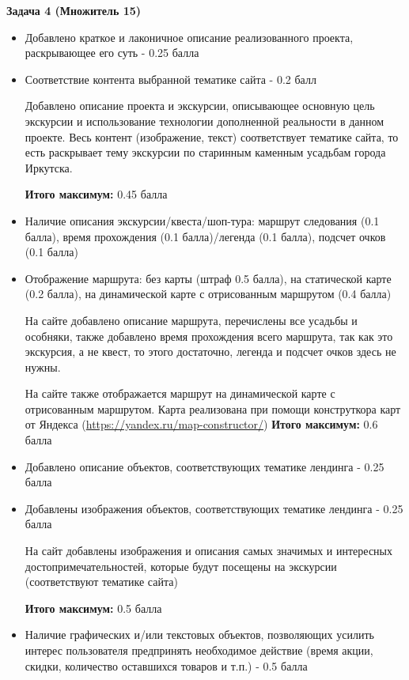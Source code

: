 \textbf{Задача 4 (Множитель 15)}
\begin{itemize}
    \item Добавлено краткое и лаконичное описание реализованного проекта, раскрывающее его суть - 0.25 балла
    \item Соответствие контента выбранной тематике сайта - 0.2 балл
    
    Добавлено описание проекта и экскурсии, описывающее основную цель экскурсии и использование технологии дополненной реальности в данном проекте. 
    Весь контент (изображение, текст) соответствует  тематике сайта, то есть раскрывает тему экскурсии по старинным каменным усадьбам города Иркутска.
    
    \textbf{Итого максимум:} 0.45 балла
    \item Наличие описания экскурсии/квеста/шоп-тура: маршрут следования (0.1 балла), время прохождения (0.1 балла)/легенда (0.1 балла), подсчет очков (0.1 балла)
    \item Отображение маршрута: без карты (штраф 0.5 балла), на статической карте (0.2 балла), на динамической карте с отрисованным маршрутом (0.4 балла)
    
    На сайте добавлено описание маршрута, перечислены все усадьбы и особняки, также добавлено время прохождения всего маршрута, так как это экскурсия, а не квест, то этого достаточно, легенда и подсчет очков здесь не нужны.
    
    На сайте также отображается маршрут на динамической карте с отрисованным маршрутом. Карта реализована при помощи конструткора карт от Яндекса (\url{https://yandex.ru/map-constructor/})
    \textbf{Итого максимум:} 0.6 балла
    
    \item Добавлено описание объектов, соответствующих тематике лендинга  - 0.25 балла
    \item Добавлены изображения объектов, соответствующих тематике лендинга - 0.25 балла
    
    На сайт добавлены изображения и описания самых значимых и интересных достопримечательностей, которые будут посещены на экскурсии (соответствуют тематике сайта) 

    \textbf{Итого максимум:} 0.5 балла
    
    \item Наличие графических и/или текстовых объектов, позволяющих усилить интерес пользователя предпринять необходимое действие (время акции, скидки, количество оставшихся товаров и т.п.) - 0.5 балла
    

\end{itemize}
